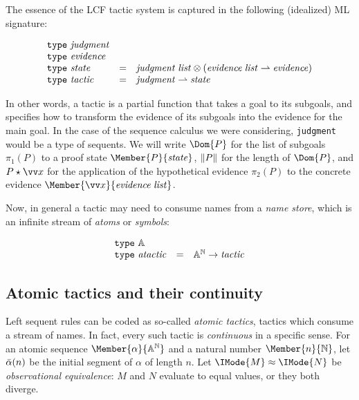 The essence of the LCF tactic system is captured in the following (idealized)
ML signature:

\[
  \begin{array}{lcl}
    \mathtt{type}\ \mathit{judgment}\\
    \mathtt{type}\ \mathit{evidence}\\
    \mathtt{type}\ \mathit{state} &= &\mathit{judgment}\;\mathit{list} \otimes (\mathit{evidence}\;\mathit{list}\rightharpoonup \mathit{evidence})\\
    \mathtt{type}\ \mathit{tactic} &= &\mathit{judgment}\rightharpoonup \mathit{state}
  \end{array}
\]

In other words, a tactic is a partial function that takes a goal to its
subgoals, and specifies how to transform the evidence of its subgoals into the
evidence for the main goal. In the case of the sequence calculus we were
considering, \verb!judgment! would be a type of sequents. We will write
$\Dom{P}$ for the list of subgoals $\pi_1(P)$ to a proof state
$\Member{P}{\LCFState}$, $\lVert P\rVert$ for the length of $\Dom{P}$, and
$\LCFStateApply{P}{\vec{x}}$ for the application of the hypothetical evidence
$\pi_2(P)$ to the concrete evidence $\Member{\vec{x}}{\MLList{\LCFEvidence}}$.

Now, in general a tactic may need to consume names from a \emph{name store},
which is an infinite stream of \emph{atoms} or \emph{symbols}:

\[
  \begin{array}{lcl}
    \mathtt{type}\ \mathbb{A}\\
    \mathtt{type}\ \mathit{atactic} &= &{\mathbb{A}}^{\mathbb{N}} \to \mathit{tactic}
  \end{array}
\]

\newcommand\KleeneEq[2]{\IMode{#1}\approx \IMode{#2}}
\newcommand\ModC[2]{\mathsf{M}(#1,#2)}

\subsection{Atomic tactics and their continuity}

Left sequent rules can be coded as so-called \emph{atomic tactics}, tactics
which consume a stream of names. In fact, every such tactic is
\emph{continuous} in a specific sense. For an atomic sequence
$\Member{\alpha}{\MLStream{\MLAtom}}$ and a natural number
$\Member{n}{\MLNat}$, let $\bar{\alpha}(n)$ be the initial segment of
$\alpha$ of length $n$. Let $\KleeneEq{M}{N}$ be \emph{observational
equivalence}: $M$ and $N$ evaluate to equal values, or they both diverge.

